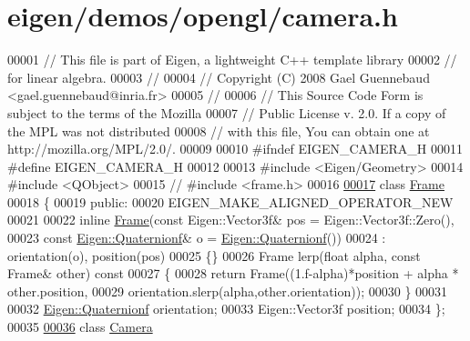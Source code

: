 \hypertarget{eigen_2demos_2opengl_2camera_8h_source}{}\section{eigen/demos/opengl/camera.h}
\label{eigen_2demos_2opengl_2camera_8h_source}

\begin{DoxyCode}
00001 \textcolor{comment}{// This file is part of Eigen, a lightweight C++ template library}
00002 \textcolor{comment}{// for linear algebra.}
00003 \textcolor{comment}{//}
00004 \textcolor{comment}{// Copyright (C) 2008 Gael Guennebaud <gael.guennebaud@inria.fr>}
00005 \textcolor{comment}{//}
00006 \textcolor{comment}{// This Source Code Form is subject to the terms of the Mozilla}
00007 \textcolor{comment}{// Public License v. 2.0. If a copy of the MPL was not distributed}
00008 \textcolor{comment}{// with this file, You can obtain one at http://mozilla.org/MPL/2.0/.}
00009 
00010 \textcolor{preprocessor}{#ifndef EIGEN\_CAMERA\_H}
00011 \textcolor{preprocessor}{#define EIGEN\_CAMERA\_H}
00012 
00013 \textcolor{preprocessor}{#include <Eigen/Geometry>}
00014 \textcolor{preprocessor}{#include <QObject>}
00015 \textcolor{comment}{// #include <frame.h>}
00016 
\hyperlink{class_frame}{00017} \textcolor{keyword}{class }\hyperlink{class_frame}{Frame}
00018 \{
00019   \textcolor{keyword}{public}:
00020     EIGEN\_MAKE\_ALIGNED\_OPERATOR\_NEW
00021     
00022     \textcolor{keyword}{inline} \hyperlink{class_frame}{Frame}(\textcolor{keyword}{const} Eigen::Vector3f& pos = Eigen::Vector3f::Zero(),
00023                  \textcolor{keyword}{const} \hyperlink{group___geometry___module_class_eigen_1_1_quaternion}{Eigen::Quaternionf}& o = 
      \hyperlink{group___geometry___module_class_eigen_1_1_quaternion}{Eigen::Quaternionf}())
00024       : orientation(o), position(pos)
00025     \{\}
00026     Frame lerp(\textcolor{keywordtype}{float} alpha, \textcolor{keyword}{const} Frame& other)\textcolor{keyword}{ const}
00027 \textcolor{keyword}{    }\{
00028       \textcolor{keywordflow}{return} Frame((1.f-alpha)*position + alpha * other.position,
00029                    orientation.slerp(alpha,other.orientation));
00030     \}
00031 
00032     \hyperlink{group___geometry___module_class_eigen_1_1_quaternion}{Eigen::Quaternionf} orientation;
00033     Eigen::Vector3f position;
00034 \};
00035 
\hyperlink{class_camera}{00036} \textcolor{keyword}{class }\hyperlink{class_camera}{Camera}

\end{DoxyCode}
